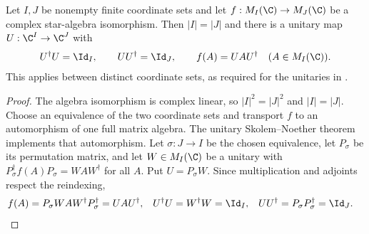 \begin{lemma}
    \label{lem:qca_full_matrix_spatial_implementer}
    \leanok
    Let $I,J$ be nonempty finite coordinate sets and let
    $f:M_I(\C)\to M_J(\C)$ be a complex star-algebra
    isomorphism. Then $|I|=|J|$ and there is a unitary map
    $U:\C^I\to\C^J$ with
    \begin{align}
        U^\dagger U=\Id_I,\qquad UU^\dagger=\Id_J,\qquad
        f(A)=UAU^\dagger\quad(A\in M_I(\C)).
    \end{align}
    This applies between distinct coordinate sets, as required for the
    unitaries in \cite[equations~\texttt{bruleU} and~\texttt{bruleV},
        lines~980--1001]{SchumacherWerner2004QCA}.
\end{lemma}

\begin{proof}
    \leanok
    The algebra isomorphism is complex linear, so $|I|^2=|J|^2$ and
    $|I|=|J|$. Choose an equivalence of the two coordinate sets and
    transport $f$ to an automorphism of one full matrix algebra.
    The unitary Skolem--Noether theorem implements that automorphism.
    Let $\sigma:J\to I$ be the chosen equivalence, let $P_\sigma$ be its
    permutation matrix, and let $W\in M_I(\C)$ be a unitary with
    $P_\sigma^\dagger f(A)P_\sigma=WAW^\dagger$ for all $A$. Put
    $U=P_\sigma W$. Since multiplication and adjoints respect the
    reindexing,
    \begin{align}
        f(A)
         & =P_\sigma WAW^\dagger P_\sigma^\dagger
        =UAU^\dagger,
         &
        U^\dagger U
         & =W^\dagger W=\Id_I,
         &
        UU^\dagger
         & =P_\sigma P_\sigma^\dagger=\Id_J.
        \label{eq:qca_full_matrix_spatial_transport}
    \end{align}
\end{proof}
